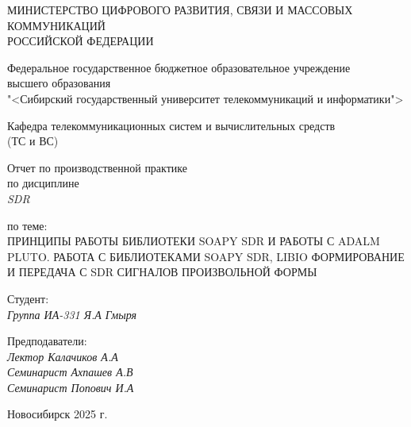\thispagestyle{empty}

\begin{center}
    МИНИСТЕРСТВО ЦИФРОВОГО РАЗВИТИЯ, СВЯЗИ И МАССОВЫХ КОММУНИКАЦИЙ \\ РОССИЙСКОЙ ФЕДЕРАЦИИ

    \vspace{20pt}

    Федеральное государственное бюджетное образовательное учреждение  \\  высшего образования \\
    "<Сибирский государственный университет телекоммуникаций и информатики"> \\

    \vspace{20pt}

    Кафедра телекоммуникационных систем и вычислительных средств \\  (ТС и ВС)
\end{center}

\vfill

\begin{center}
    Отчет по производственной практике \\  
    по дисциплине \\
    \textit{SDR}

    \vspace{20pt}
    по теме: \\
    \uppercase{Принципы работы библиотеки Soapy SDR и работы с Adalm Pluto. Работа с библиотеками Soapy SDR, Libio  
    Формирование и передача с SDR сигналов произвольной формы}
\end{center}

\vfill

    \noindent Студент: \\
    \textit{Группа ИА-331 \hfill Я.А Гмыря}

    \vspace{20pt}

    \noindent Предподаватели: \\
    \textit{Лектор \hfill Калачиков А.А} \\
    \textit{Семинарист \hfill Ахпашев А.В} \\
    \textit{Семинарист \hfill Попович И.А}

\vfill

\begin{center}
    Новосибирск 2025 г.
\end{center}